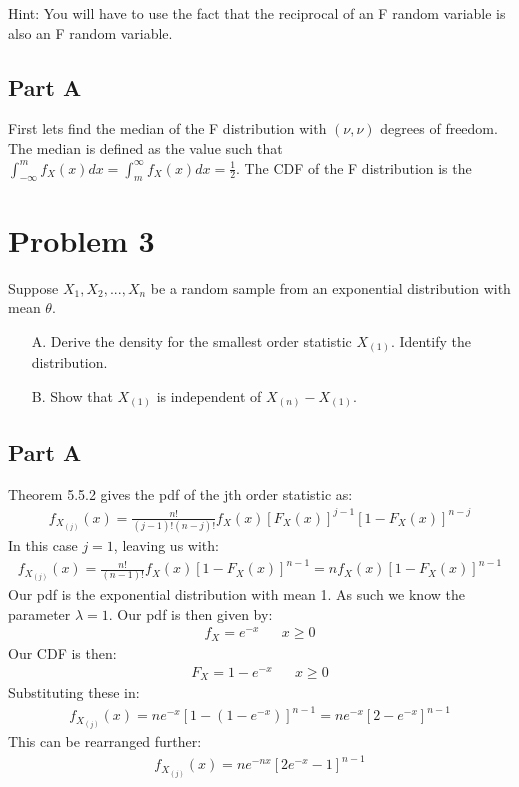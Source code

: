 \documentclass{article}
\begin{document}
Hint: You will have to use the fact that the reciprocal of an F random variable is also an F random
variable.

\subsection*{Part A}
First lets find the median of the F distribution with $(\nu, \nu)$ degrees of freedom. The median is defined as the value such that $\int_{-\infty}^{m} f_X(x) dx = \int_{m}^{\infty} f_X(x) dx = \frac{1}{2}$. The CDF of the F distribution is the 

    
\clearpage
\section*{Problem 3}
Suppose $X_1,X_2,...,X_n$ be a random sample from an exponential distribution with mean $\theta$.
\begin{enumerate}
\item[A.] Derive the density for the smallest order statistic $X_{(1)}$. Identify the distribution.
\item[B.] Show that $X_{(1)}$ is independent of $X_{(n)}-X_{(1)}$.
\end{enumerate}
\subsection*{Part A}
Theorem 5.5.2 gives the pdf of the jth order statistic as:
\begin{align*}
f_{X_{(j)}}(x) = \frac{n!}{(j-1)!(n-j)!} f_X(x) [F_X(x)]^{j-1} [1-F_X(x)]^{n-j}
\end{align*}
In this case $j=1$, leaving us with:
\begin{align*}
f_{X_{(j)}}(x) = \frac{n!}{(n-1)!} f_X(x) [1-F_X(x)]^{n-1} = n f_X(x) [1-F_X(x)]^{n-1}
\end{align*}
Our pdf is the exponential distribution with mean 1. As such we know the parameter $\lambda=1$. Our pdf is then given by:\begin{align*}
f_X = e^{-x} && x \geq 0
\end{align*}
Our CDF is then:
\begin{align*}
F_X = 1-e^{-x} && x \geq 0
\end{align*}
Substituting these in:
\begin{align*}
f_{X_{(j)}}(x) = n e^{-x} [1-(1-e^{-x})]^{n-1} = n e^{-x} [2-e^{-x}]^{n-1}
\end{align*}
This can be rearranged further:
\begin{align*}
f_{X_{(j)}}(x) = n e^{-nx} [2e^{-x}-1]^{n-1}
\end{align*}
\end{document}
